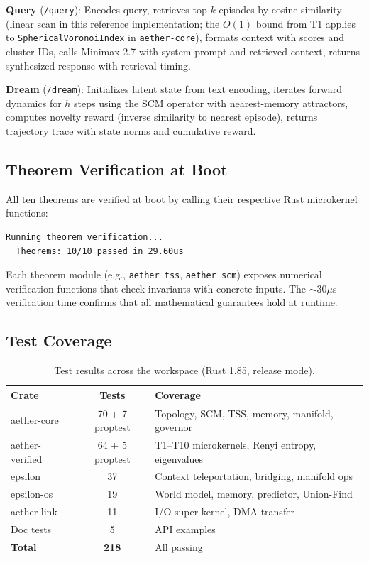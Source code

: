 \documentclass[11pt, a4paper]{article}
\theoremstyle{proofform}
\numberwithin{innerpoints}{subsection}
\numberwithin{disproof}{subsection}
\theoremstyle{mathproof}
\begin{document}
\textbf{Query} (\texttt{/query}): Encodes query, retrieves top-$k$ episodes by cosine similarity (linear scan in this reference implementation; the $O(1)$ bound from T1 applies to \texttt{SphericalVoronoiIndex} in \texttt{aether-core}), formats context with scores and cluster IDs, calls Minimax 2.7 with system prompt and retrieved context, returns synthesized response with retrieval timing.

\textbf{Dream} (\texttt{/dream}): Initializes latent state from text encoding, iterates forward dynamics for $h$ steps using the SCM operator with nearest-memory attractors, computes novelty reward (inverse similarity to nearest episode), returns trajectory trace with state norms and cumulative reward.

\subsection{Theorem Verification at Boot}

All ten theorems are verified at boot by calling their respective Rust microkernel functions:

\begin{lstlisting}[caption={Boot theorem verification (actual output)}]
  Running theorem verification...
  Theorems: 10/10 passed in 29.60us
\end{lstlisting}

Each theorem module (e.g., \texttt{aether\_tss}, \texttt{aether\_scm}) exposes numerical verification functions that check invariants with concrete inputs. The $\sim$30$\mu$s verification time confirms that all mathematical guarantees hold at runtime.

\subsection{Test Coverage}

\begin{table}[h!]
\centering
\caption{Test results across the workspace (Rust 1.85, release mode).}
\label{tab:tests}
\begin{tabular}{l|c|l}
\hline
\textbf{Crate} & \textbf{Tests} & \textbf{Coverage} \\
\hline
aether-core & 70 + 7 proptest & Topology, SCM, TSS, memory, manifold, governor \\
aether-verified & 64 + 5 proptest & T1--T10 microkernels, Renyi entropy, eigenvalues \\
epsilon & 37 & Context teleportation, bridging, manifold ops \\
epsilon-os & 19 & World model, memory, predictor, Union-Find \\
aether-link & 11 & I/O super-kernel, DMA transfer \\
Doc tests & 5 & API examples \\
\hline
\textbf{Total} & \textbf{218} & All passing \\
\hline
\end{tabular}
\end{table}
\end{document}
